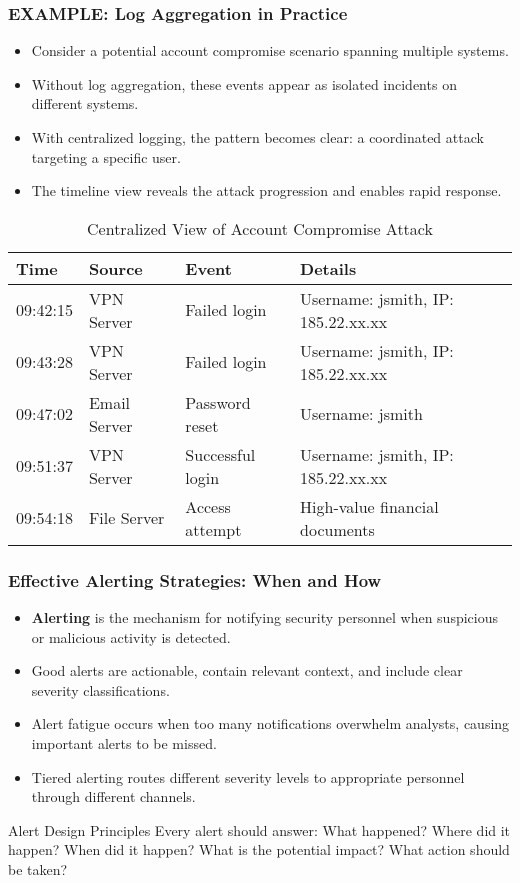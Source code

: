 \documentclass{beamer}
\begin{document}
\begin{frame}
\frametitle{EXAMPLE: Log Aggregation in Practice}
\begin{itemize}
\item Consider a potential account compromise scenario spanning multiple systems.
\item Without log aggregation, these events appear as isolated incidents on different systems.
\item With centralized logging, the pattern becomes clear: a coordinated attack targeting a specific user.
\item The timeline view reveals the attack progression and enables rapid response.
\end{itemize}

\begin{table}
\scriptsize
\begin{tabular}{llll}
\toprule
\textbf{Time} & \textbf{Source} & \textbf{Event} & \textbf{Details} \\
\midrule
09:42:15 & VPN Server & Failed login & Username: jsmith, IP: 185.22.xx.xx \\
09:43:28 & VPN Server & Failed login & Username: jsmith, IP: 185.22.xx.xx \\
09:47:02 & Email Server & Password reset & Username: jsmith \\
09:51:37 & VPN Server & Successful login & Username: jsmith, IP: 185.22.xx.xx \\
09:54:18 & File Server & Access attempt & High-value financial documents \\
\bottomrule
\end{tabular}
\caption{Centralized View of Account Compromise Attack}
\end{table}
\end{frame}

\begin{frame}
\frametitle{Effective Alerting Strategies: When and How}
\begin{itemize}
\item \textbf{Alerting} is the mechanism for notifying security personnel when suspicious or malicious activity is detected.
\item Good alerts are actionable, contain relevant context, and include clear severity classifications.
\item Alert fatigue occurs when too many notifications overwhelm analysts, causing important alerts to be missed.
\item Tiered alerting routes different severity levels to appropriate personnel through different channels.
\end{itemize}

\begin{alertblock}{Alert Design Principles}
Every alert should answer: What happened? Where did it happen? When did it happen? What is the potential impact? What action should be taken?
\end{alertblock}
\end{frame}
\end{document}
